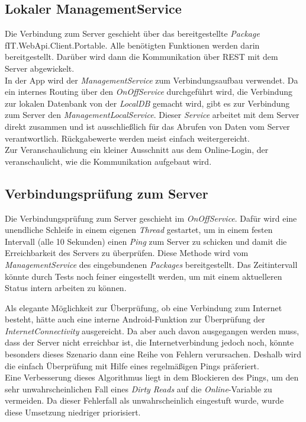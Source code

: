 \subsection{Lokaler ManagementService}
\label{ssec:nat-ManagementServiceLocal}
Die Verbindung zum Server geschieht über das bereitgestellte \textit{Package} fIT.WebApi.Client.Portable. Alle benötigten Funktionen werden darin bereitgestellt. Darüber wird dann die Kommunikation über REST mit dem Server abgewickelt.\\
In der App wird der \textit{ManagementService} zum Verbindungsaufbau verwendet. Da ein internes Routing über den \textit{OnOffService} durchgeführt wird, die Verbindung zur lokalen Datenbank von der \textit{LocalDB} gemacht wird, gibt es zur Verbindung zum Server den \textit{ManagementLocalService}. Dieser \textit{Service} arbeitet mit dem Server direkt zusammen und ist ausschließlich für das Abrufen von Daten vom Server verantwortlich. Rückgabewerte werden meist einfach weitergereicht.\\
Zur Veranschaulichung ein kleiner Ausschnitt aus dem Online-Login, der veranschaulicht, wie die Kommunikation aufgebaut wird.

\subsection{Verbindungsprüfung zum Server}
\label{ssec:nat-konnektivität}
Die Verbindungsprüfung zum Server geschieht im \textit{OnOffService}. Dafür wird eine unendliche Schleife in einem eigenen \textit{Thread} gestartet, um in einem festen Intervall (alle 10 Sekunden) einen \textit{Ping} zum Server zu schicken und damit die Erreichbarkeit des Servers zu überprüfen. Diese Methode wird vom \textit{ManagementService} des eingebundenen \textit{Packages} bereitgestellt. Das Zeitintervall könnte durch Tests noch feiner eingestellt werden, um mit einem aktuelleren Status intern arbeiten zu können.

Als elegante Möglichkeit zur Überprüfung, ob eine Verbindung zum Internet besteht, hätte auch eine interne Android-Funktion zur Überprüfung der \textit{InternetConnectivity} ausgereicht. Da aber auch davon ausgegangen werden muss, dass der Server nicht erreichbar ist, die Internetverbindung jedoch noch, könnte besonders dieses Szenario dann eine Reihe von Fehlern verursachen. Deshalb wird die einfach Überprüfung mit Hilfe eines regelmäßigen Pings präferiert.\\
Eine Verbesserung dieses Algorithmus liegt in dem Blockieren des Pings, um den sehr unwahrscheinlichen Fall eines \textit{Dirty Reads} auf die \textit{Online}-Variable zu vermeiden. Da dieser Fehlerfall als unwahrscheinlich eingestuft wurde, wurde diese Umsetzung niedriger priorisiert.

